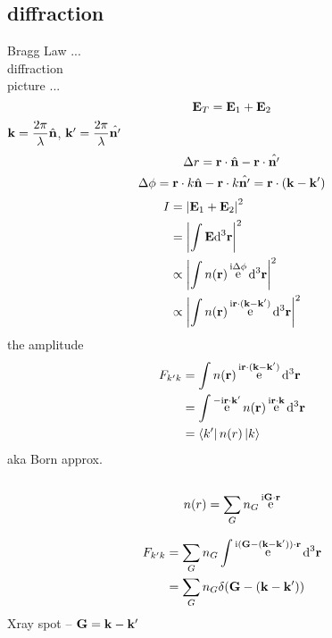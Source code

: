 \documentclass[UTF8]{ctexart} %
\DeclareMathOperator{\e}{\mathrm{e}}
\renewcommand{\I}{\mathrm{i}}
\numberwithin{equation}{section}
\begin{document}
\subsection{diffraction}
Bragg Law ...\\
diffraction\\
picture ...
\begin{equation}\label{key}
\vb{E}_T = \vb{E}_1 +\vb{E}_2
\end{equation}
$ \vb{k} = \dfrac{2\pi}{\lambda}\hat{\vb{n}} $, $ \vb{k}' = \dfrac{2\pi}{\lambda}\hat{\vb{n}'} $
\begin{equation}\label{key}
\Delta r = \vb{r}\cdot\hat{\vb{n}} - \vb{r}\cdot\hat{\vb{n}'}
\end{equation}
\begin{equation}\label{key}
\Delta\phi = \vb{r}\cdot k\hat{\vb{n}} - \vb{r}\cdot k\hat{\vb{n}'}
= \vb{r}\cdot(\vb{k} - \vb{k}')
\end{equation}
\begin{equation}\label{key}
\begin{aligned}
I &= \abs{\vb{E}_1 + \vb{E}_2}^2\\
&= \abs{\int\vb{E}\dd[3]\vb{r}}^2\\
&\propto \abs{\int n(\vb{r})\e^{\I\Delta\phi}\dd[3]\vb{r}}^2\\
&\propto \abs{\int n(\vb{r})\e^{\I\vb{r}\cdot(\vb{k} - \vb{k}')}\dd[3]\vb{r}}^2
\end{aligned}
\end{equation}
the amplitude
\begin{equation}\label{key}
\begin{aligned}
F_{k'k} &= \int n(\vb{r})\e^{\I\vb{r}\cdot(\vb{k} - \vb{k}')} \dd[3]\vb{r}\\
&= \int \e^{-\I\vb{r}\cdot\vb{k}'} n(\vb{r}) \e^{\I\vb{r}\cdot\vb{k}} \dd[3]\vb{r}\\
&= \bra{k'}n(r)\ket{k}
\end{aligned}
\end{equation}
aka Born approx.\\
~\\
\begin{equation}\label{key}
n(r) = \sum_G n_G \e^{\I\vb{G}\cdot\vb{r}}
\end{equation}

\begin{equation}\label{key}
\begin{aligned}
F_{k'k} &= \sum_G n_G \int \e^{\I(\vb{G} - (\vb{k} - \vb{k}'))\cdot\vb{r}} \dd[3]\vb{r}\\
&= \sum_G n_G \delta(\vb{G} - (\vb{k} - \vb{k}'))
\end{aligned}
\end{equation}
Xray spot -- $ \vb{G} = \vb{k} - \vb{k}' $
\end{document}
